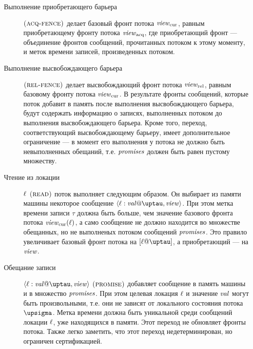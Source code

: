 \begin{description}
  \item[Выполнение приобретающего барьера] $\textsc{(acq-fence)}$
    делает базовый фронт потока $\mathit{view}_{\mathrm{cur}}$, равным приобретающему фронту потока $\mathit{view}_{\mathrm{acq}}$,
    где приобретающий фронт --- объединение фронтов сообщений, прочитанных потоком к этому моменту, и меток времени записей,
    произведенных потоком.

  \item[Выполнение высвобождающего барьера] $\textsc{(rel-fence)}$
    делает высвобождающий фронт потока $\mathit{view}_{\mathrm{rel}}$, равным базовому фронту потока $\mathit{view}_{\mathrm{cur}}$.
    В результате фронты сообщений, которые поток добавит в память после выполнения высвобождающего барьера, будут содержать
    информацию о записях, выполненных потоком до выполнения высвобождающего барьера.
    Кроме того, переход, соответствующий высвобождающему барьеру, имеет дополнительное ограничение --- в момент его выполнения
    у потока не должно быть невыполненных обещаний, т.е. $\mathit{promises}$ должен быть равен пустому множеству.
  
  \item[Чтение из локации] $\ell$ $\textsc{(read)}$ поток выполняет следующим образом.
    Он выбирает из памяти машины некоторое сообщение $\writeEvt{\loc}{\stval}{\tau}{\R}$.
    При этом метка времени записи $\tau$ должна
    быть больше, чем значение базового фронта потока $\mathit{view}_{\mathrm{cur}}(\ell)$, а само сообщение не должно находится
    во множестве обещанных, но не выполненых потоком сообщений $\mathit{promises}$.
    Это правило увеличивает базовый фронт потока на $[\loc@\tau]$, а приобретающий --- на $\mathit{view}$.
    
  \item[Обещание записи] $\writeEvt{\loc}{\stval}{\tau}{\R}$ $\textsc{(promise)}$ добавляет сообщение в память машины и
    в множество $\mathit{promises}$. При этом целевая локация $\ell$ и значение $\mathit{val}$ могут быть
    произвольными, т.е. они не зависят от локального состояния потока $\pstate$.
    Метка времени должна быть уникальной среди сообщений локации $\ell$, уже находящихся в памяти.
    Этот переход не обновляет фронты потока. Также легко заметить, что этот переход
    недетерминирован, но ограничен сертификацией.
    

\end{description}
